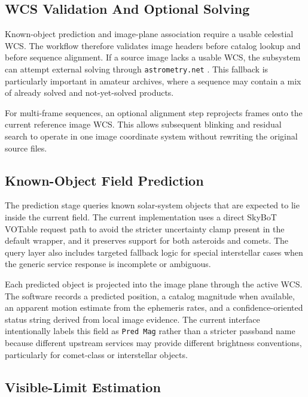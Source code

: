 \documentclass[modern]{aastex701}
\begin{document}
\subsection{WCS Validation And Optional Solving}\label{subsec:wcs}

Known-object prediction and image-plane association require a usable celestial WCS. The workflow therefore validates image headers before catalog lookup and before sequence alignment. If a source image lacks a usable WCS, the subsystem can attempt external solving through \texttt{astrometry.net} \citep{astrometrynet}. This fallback is particularly important in amateur archives, where a sequence may contain a mix of already solved and not-yet-solved products.

For multi-frame sequences, an optional alignment step reprojects frames onto the current reference image WCS. This allows subsequent blinking and residual search to operate in one image coordinate system without rewriting the original source files.

\subsection{Known-Object Field Prediction}\label{subsec:prediction}

The prediction stage queries known solar-system objects that are expected to lie inside the current field. The current implementation uses a direct SkyBoT VOTable request path to avoid the stricter uncertainty clamp present in the default wrapper, and it preserves support for both asteroids and comets. The query layer also includes targeted fallback logic for special interstellar cases when the generic service response is incomplete or ambiguous.

Each predicted object is projected into the image plane through the active WCS. The software records a predicted position, a catalog magnitude when available, an apparent motion estimate from the ephemeris rates, and a confidence-oriented status string derived from local image evidence. The current interface intentionally labels this field as \texttt{Pred Mag} rather than a stricter passband name because different upstream services may provide different brightness conventions, particularly for comet-class or interstellar objects.

\subsection{Visible-Limit Estimation}\label{subsec:visiblelimit}
\end{document}
